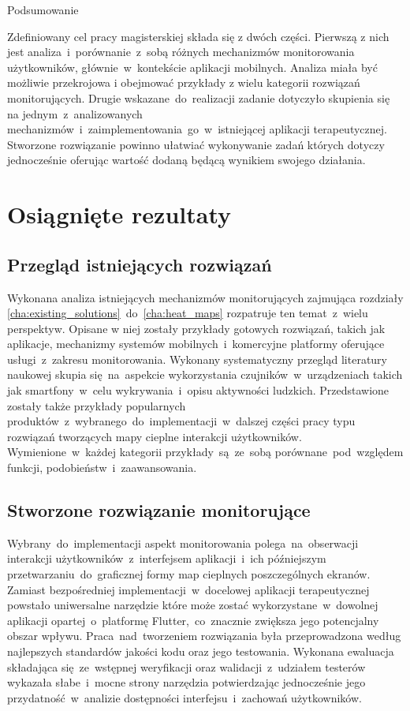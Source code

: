  \begin{chapter}{Podsumowanie}
	\newcommand{\chapterPath}{chapters/Summary}

	Zdefiniowany cel pracy magisterskiej składa się z dwóch części. Pierwszą z nich jest analiza~i~porównanie~z~sobą różnych mechanizmów monitorowania użytkowników, głównie~w~kontekście aplikacji mobilnych. Analiza miała być możliwie przekrojowa i obejmować przykłady z wielu kategorii rozwiązań monitorujących. Drugie wskazane~do~realizacji zadanie dotyczyło skupienia się na jednym~z~analizowanych mechanizmów~i~zaimplementowania~go~w~istniejącej aplikacji terapeutycznej. Stworzone rozwiązanie powinno ułatwiać wykonywanie zadań których dotyczy jednocześnie oferując wartość dodaną będącą wynikiem swojego działania.
	
	\section{Osiągnięte rezultaty}
	
	\subsection{Przegląd istniejących rozwiązań}
	Wykonana analiza istniejących mechanizmów monitorujących zajmująca rozdziały \ref{cha:existing_solutions}~do~\ref{cha:heat_maps} rozpatruje ten temat~z~wielu perspektyw. Opisane w niej zostały przykłady gotowych rozwiązań, takich jak aplikacje, mechanizmy systemów mobilnych~i~komercyjne platformy oferujące usługi~z~zakresu monitorowania. Wykonany systematyczny przegląd literatury naukowej skupia się~na~aspekcie wykorzystania czujników~w~urządzeniach takich jak smartfony~w~celu wykrywania~i~opisu aktywności ludzkich. Przedstawione zostały także przykłady popularnych produktów~z~wybranego~do~implementacji~w~dalszej części pracy typu rozwiązań tworzących mapy cieplne interakcji użytkowników. Wymienione~w~każdej kategorii przykłady~są~ze~sobą porównane~pod~względem funkcji, podobieństw~i~zaawansowania.
	
	\subsection{Stworzone rozwiązanie monitorujące}
	Wybrany~do~implementacji aspekt monitorowania polega~na~obserwacji interakcji użytkowników~z~interfejsem aplikacji~i~ich późniejszym przetwarzaniu~do~graficznej formy map cieplnych poszczególnych ekranów. Zamiast bezpośredniej implementacji~w~docelowej aplikacji terapeutycznej powstało uniwersalne narzędzie które może zostać wykorzystane~w~dowolnej aplikacji opartej~o~platformę Flutter,~co~znacznie zwiększa jego potencjalny obszar wpływu. Praca~nad~tworzeniem rozwiązania była przeprowadzona według najlepszych standardów jakości kodu oraz jego testowania. Wykonana ewaluacja składająca się~ze~wstępnej weryfikacji oraz walidacji~z~udziałem testerów wykazała słabe~i~mocne strony narzędzia potwierdzając jednocześnie jego przydatność~w~analizie dostępności interfejsu~i~zachowań użytkowników. 
	

\end{chapter}
